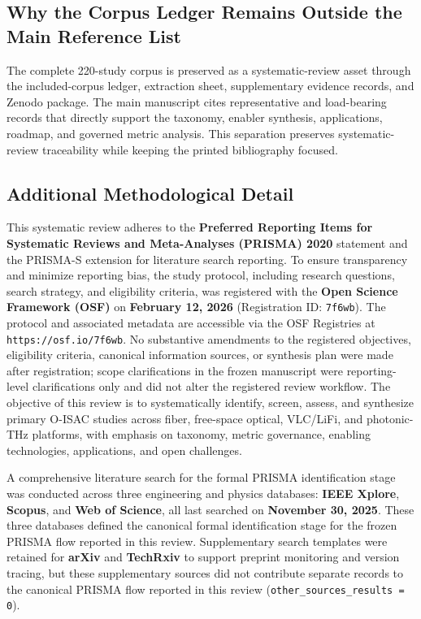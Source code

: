 \documentclass[letterpaper,journal]{IEEEtran}
\begin{document}
\subsection{Why the Corpus Ledger Remains Outside the Main Reference List}

The complete 220-study corpus is preserved as a systematic-review asset through the included-corpus ledger, extraction sheet, supplementary evidence records, and Zenodo package. The main manuscript cites representative and load-bearing records that directly support the taxonomy, enabler synthesis, applications, roadmap, and governed metric analysis. This separation preserves systematic-review traceability while keeping the printed bibliography focused.

\subsection{Additional Methodological Detail}

This systematic review adheres to the \textbf{Preferred Reporting Items for Systematic Reviews and Meta-Analyses (PRISMA) 2020} statement and the PRISMA-S extension for literature search reporting. To ensure transparency and minimize reporting bias, the study protocol, including research questions, search strategy, and eligibility criteria, was registered with the \textbf{Open Science Framework (OSF)} on \textbf{February 12, 2026} (Registration ID: \texttt{7f6wb}). The protocol and associated metadata are accessible via the OSF Registries at \texttt{https://osf.io/7f6wb}.
No substantive amendments to the registered objectives, eligibility criteria, canonical information sources, or synthesis plan were made after registration; scope clarifications in the frozen manuscript were reporting-level clarifications only and did not alter the registered review workflow.
The objective of this review is to systematically identify, screen, assess, and synthesize primary O-ISAC studies across fiber, free-space optical, VLC/LiFi, and photonic-THz platforms, with emphasis on taxonomy, metric governance, enabling technologies, applications, and open challenges.

A comprehensive literature search for the formal PRISMA identification stage was conducted across three engineering and physics databases: \textbf{IEEE Xplore}, \textbf{Scopus}, and \textbf{Web of Science}, all last searched on \textbf{November 30, 2025}. These three databases defined the canonical formal identification stage for the frozen PRISMA flow reported in this review. Supplementary search templates were retained for \textbf{arXiv} and \textbf{TechRxiv} to support preprint monitoring and version tracing, but these supplementary sources did not contribute separate records to the canonical PRISMA flow reported in this review (\texttt{other\_sources\_results = 0}).
\end{document}

